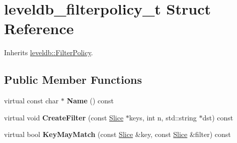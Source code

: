\hypertarget{structleveldb__filterpolicy__t}{}\section{leveldb\+\_\+filterpolicy\+\_\+t Struct Reference}
\label{structleveldb__filterpolicy__t}


Inherits \mbox{\hyperlink{classleveldb_1_1_filter_policy}{leveldb\+::\+Filter\+Policy}}.

\subsection*{Public Member Functions}
\begin{DoxyCompactItemize}
\item 
\mbox{\label{structleveldb__filterpolicy__t_a94f31f3d4576ed53d9277e461717e9f3}} 
virtual const char $\ast$ {\bfseries Name} () const
\item 
\mbox{\label{structleveldb__filterpolicy__t_aa833af852917381cd8db4c8ec21a3762}} 
virtual void {\bfseries Create\+Filter} (const \mbox{\hyperlink{classleveldb_1_1_slice}{Slice}} $\ast$keys, int n, std\+::string $\ast$dst) const
\item 
\mbox{\label{structleveldb__filterpolicy__t_a76ed49d956a58622e86d87a89a9ba1f1}} 
virtual bool {\bfseries Key\+May\+Match} (const \mbox{\hyperlink{classleveldb_1_1_slice}{Slice}} \&key, const \mbox{\hyperlink{classleveldb_1_1_slice}{Slice}} \&filter) const
\end{DoxyCompactItemize}
